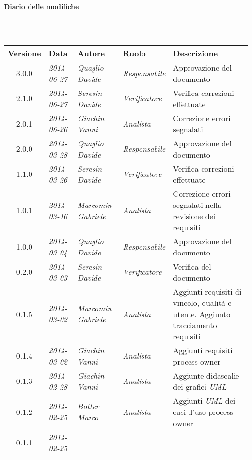 \noindent\begin{Large}\textbf{Diario delle modifiche}\end{Large}\\
\\
\begin{small}
\begin{tabular}{|c|p{1.8cm}|p{2.8cm}|p{2.8cm}|p{3.5cm}|}
\hline
Versione & Data & Autore & Ruolo & Descrizione \\
\hline
\hline
3.0.0 & \textit{2014-06-27} &
\textit{Quaglio Davide} &
\textit{Responsabile} &  Approvazione del documento\\
\hline
2.1.0 & \textit{2014-06-27} &
\textit{Seresin Davide} &
\textit{Verificatore} &  Verifica correzioni effettuate\\
\hline
2.0.1 & \textit{2014-06-26} &
\textit{Giachin Vanni} &
\textit{Analista} &  Correzione errori segnalati\\
\hline
2.0.0 & \textit{2014-03-28} &
\textit{Quaglio Davide} &
\textit{Responsabile} &  Approvazione del documento\\
\hline
1.1.0 & \textit{2014-03-26} &
\textit{Seresin Davide} &
\textit{Verificatore} &  Verifica correzioni effettuate\\
\hline
1.0.1 & \textit{2014-03-16} &
\textit{Marcomin Gabriele} &
\textit{Analista} &  Correzione errori segnalati nella revisione dei requisiti\\
\hline
1.0.0 & \textit{2014-03-04} &
\textit{Quaglio Davide} &
\textit{Responsabile} &  Approvazione del documento\\
\hline
0.2.0 & \textit{2014-03-03} &
\textit{Seresin Davide} &
\textit{Verificatore} &  Verifica del documento\\
\hline
0.1.5 & \textit{2014-03-02} &
\textit{Marcomin Gabriele} &
\textit{Analista} &  Aggiunti requisiti di vincolo, qualità e utente. Aggiunto tracciamento requisiti\\
\hline
0.1.4 & \textit{2014-03-02} &
\textit{Giachin Vanni} &
\textit{Analista} &  Aggiunti requisiti process owner\\
\hline
0.1.3 & \textit{2014-02-28} &
\textit{Giachin Vanni} &
\textit{Analista} &  Aggiunte didascalie dei grafici \textit{UML}\\
\hline
0.1.2 & \textit{2014-02-25} &
\textit{Botter Marco} &
\textit{Analista} &  Aggiunti \textit{UML} dei casi d'uso process owner\\
\hline
0.1.1 & \textit{2014-02-25} &

\end{tabular}
\end{small}
